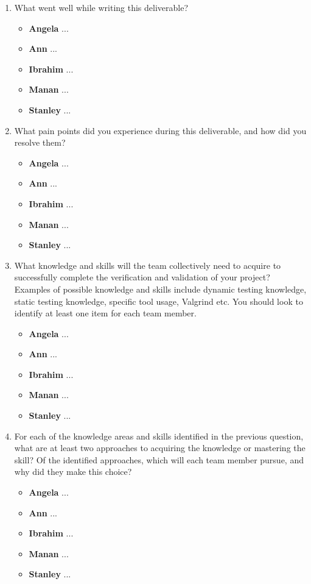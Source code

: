 \documentclass[12pt, titlepage]{article}
\begin{document}
\begin{enumerate}
  \item What went well while writing this deliverable? 
  \begin{itemize}
      \item \textbf{Angela} ...
      \item \textbf{Ann} ...
      \item \textbf{Ibrahim} ...
      \item \textbf{Manan} ...
      \item \textbf{Stanley} ...
    \end{itemize}
  \item What pain points did you experience during this deliverable, and how
    did you resolve them?
  \begin{itemize}
      \item \textbf{Angela} ...
      \item \textbf{Ann} ...
      \item \textbf{Ibrahim} ...
      \item \textbf{Manan} ...
      \item \textbf{Stanley} ...
    \end{itemize}

  \item What knowledge and skills will the team collectively need to acquire to
  successfully complete the verification and validation of your project?
  Examples of possible knowledge and skills include dynamic testing knowledge,
  static testing knowledge, specific tool usage, Valgrind etc.  You should look to
  identify at least one item for each team member.
  \begin{itemize}
      \item \textbf{Angela} ...
      \item \textbf{Ann} ...
      \item \textbf{Ibrahim} ...
      \item \textbf{Manan} ...
      \item \textbf{Stanley} ...
    \end{itemize}

  \item For each of the knowledge areas and skills identified in the previous
  question, what are at least two approaches to acquiring the knowledge or
  mastering the skill?  Of the identified approaches, which will each team
  member pursue, and why did they make this choice?
  \begin{itemize}
      \item \textbf{Angela} ...
      \item \textbf{Ann} ...
      \item \textbf{Ibrahim} ...
      \item \textbf{Manan} ...
      \item \textbf{Stanley} ...
    \end{itemize}

\end{enumerate}
\end{document}
